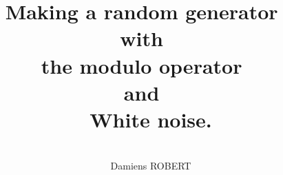 \documentclass{article}
\title{Making a random generator
~\\
with
~\\
the modulo operator
~\\
and 
~\\
White noise.
}
\date{
~\\
}
\author{
~\\
Damiens ROBERT
}
\begin{document}
  \maketitle
  \section{}
\end{document}
